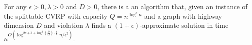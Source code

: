 \documentclass[twoside,leqno]{article}
\newcommand{\calT}{{\cal T}}
\newcommand{\opt}{\mbox{\sc opt}}
\newcommand{\OPT}{\mbox{\sc OPT}}
\newcommand{\eps}{\epsilon}
\newcommand{\cost}{\text{cost}}
\DeclarePairedDelimiter\autobracket{(}{)}
\newcommand{\br}[1]{\autobracket*{#1}}
\begin{document}
\begin{theorem}
For any $\eps > 0, \lambda > 0$ and $D > 0$, there is a an algorithm that, given an instance of the splittable CVRP with capacity $Q = n^{\log^c n}$ and a graph with highway dimension $D$ and violation $\lambda$ finds
a $(1+\eps)$-approximate solution in time $n^{O( \log^{2c + 3 + \log^2(\frac{D}{\eps \lambda})\cdot \frac{1}{\lambda}}n/\eps^2)}$.
\end{theorem}
\begin{comment}
\begin{proof}
Let $\OPT_H$ be the optimal solution in the host graph $H$, which is the bounded treewidth graph and let $\OPT_G$ be the optimal solution in the original graph $G$. Let $\opt_G$ and $\opt_H$ denote the cost of the optimal solutions in graph $G$ and $H$. A tour is a set of edges denoting the order in which nodes are visited. Let $\cost_G(\OPT)$ denote the cost of the set of tours in $\OPT$ when used on graph $G$. Our goal is to show that $\cost_G(\OPT_H) \le (1 + \eps)\cost_G(\OPT(G)) \le (1 + \eps)\opt$. 

We will use the embedding presented by Lemma \ref{lem:highway-embe} to embed $G$ into $H$ and use the fact that for any two nodes $u,v$, on expectation
$$d_G(u,v) \le d_H(u,v) \le (1 + \eps) d_G(u,v).$$
Note that the vertices are the same in both $H$ and $G$, so a solution to an instance in $H$ is also a solution in $G$ (and vice versa). Since $d_G(u,v) \le d_H(u,v)$, we know for any solution $\OPT$, $\cost_G(\OPT) \le \cost_H(\OPT)$. Note that $\cost_H(\OPT_H) \le \cost_H(\OPT_G)$. 
\begin{equation*}
    \begin{split}
        \cost_G(\OPT_H) & \le \cost_H(\OPT_H) \le \cost_H(\OPT_G) \\ 
        & = \sum_{\calT_i \in \OPT_G} \cost_H(\calT_i) =\sum_{\calT_i \in \OPT_G}\sum_{uv \in E(\calT_i)} d_H(u,v) \\
        & \le \sum_{\calT_i \in \OPT_G}\sum_{uv \in E(\calT_i)} (1 + \eps) d_G(u,v) \\ 
        & = (1 + \eps) \sum_{\calT_i \in \OPT_G} \cost_G(\calT_i) \\ 
        & = (1 + \eps)\cost_G(\OPT_G) \\ 
    \end{split}
\end{equation*}
Hence, for an appropriate choice of $\eps$, we can find a $(1 + \eps)$-approximation for a graph $G$ which has bounded highway dimension. Recall that the time complexity of for splittable CVRP on bounded treewidth graphs is $n^{O(k^2 \log^{2c + 3}n/\eps^2)}$. Since the treewidth of $H$, $k \le (\log \Delta)^{O\br{\log^2(\frac{D}{\eps \lambda})/\lambda}}$, we get that the running time of our algorithm is $n^{O( \log^{2c + 3 + \log^2(\frac{D}{\eps \lambda})\cdot \frac{1}{\lambda}}n/\eps^2)}$.
\end{proof}
\end{comment}
\end{document}

